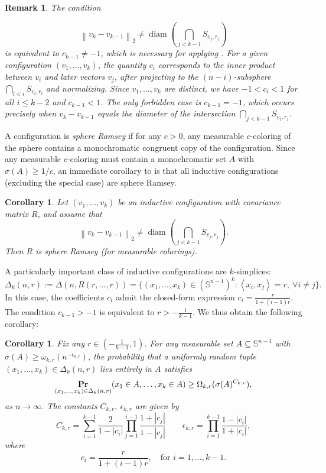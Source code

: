 \documentclass[11pt]{article}
\newtheorem{corollary}[theorem]{Corollary}
\newtheorem{remark}[theorem]{Remark}
\newcommand{\inner}[1]{\left\langle{#1}\right\rangle}
\newcommand{\norm}[1]{\left\lVert#1\right\rVert}
\renewcommand{\Pr}{\mathop{\bf Pr\/}}
\newcommand{\sn}{{\mathbb{S}^{n-1} }}
\begin{document}
\begin{remark}
\label{rem: diameter condition}
The condition 

\[
\norm{v_k - v_{k-1}}_2 \neq \operatorname{diam}\left(\bigcap_{j < k-1} S_{v_j, r_j}\right)
\]
is equivalent to \( c_{k-1} \neq -1 \), which is necessary for applying . For a given configuration \( (v_1, \dots, v_k) \), the quantity \( c_i \) corresponds to the inner product between \( v_i \) and later vectors \( v_j \), after projecting to the $(n-i)$-subsphere \( \bigcap_{l < i} S_{v_l, r_l} \) and normalizing. Since \( v_1, \dots, v_k \) are distinct, we have \( -1 < c_i < 1 \) for all \( i \leq k - 2 \) and \( c_{k-1} < 1 \). The only forbidden case is \( c_{k-1} = -1 \), which occurs precisely when \( v_k - v_{k-1} \) equals the diameter of the intersection $\bigcap_{j < k-1} S_{v_j, r_j}$.
\end{remark}

A configuration is \textit{sphere Ramsey} if for any $c>0$, any measurable $c$-coloring of the sphere contains a monochromatic congruent copy of the configuration. Since any measurable $c$-coloring must contain a monochromatic set $A$ with $\sigma(A)\geq 1/c$, an immediate corollary to  is that all inductive configurations (excluding the special case) are sphere Ramsey.
\begin{corollary}
    Let \( (v_1, \dots, v_k) \) be an inductive configuration with covariance matrix \( R \), and assume that
\[
\norm{v_k - v_{k-1}}_2 \neq \operatorname{diam}\left(\bigcap_{j < k-1} S_{v_j, r_j}\right).
\]
Then $R$ is sphere Ramsey (for measurable colorings).
\end{corollary}

A particularly important class of inductive configurations are \( k \)-simplices:
\[
\Delta_k(n, r) := \Delta(n, R(r, \dots, r)) = \{(x_1, \dots, x_k) \in (\sn)^k : \inner{x_i, x_j} = r,\ \forall i \neq j \}.
\]
In this case, the coefficients \( c_i \) admit the closed-form expression \( c_i = \frac{r}{1 + (i - 1)r} \). The condition \( c_{k-1} > -1 \) is equivalent to \( r > -\frac{1}{k - 1} \). We thus obtain the following corollary:

\begin{corollary}
\label{col: k simplex density}
Fix any \( r \in \left(-\frac{1}{k - 1}, 1\right) \). For any measurable set \( A \subseteq \mathbb{S}^{n-1} \) with \( \sigma(A) \geq \omega_{k,r}(n^{-\epsilon_{k,r}}) \), the probability that a uniformly random tuple \( (x_1, \dots, x_k) \in \Delta_k(n, r) \) lies entirely in \( A \) satisfies
\[
\Pr_{(x_1, \dots, x_k) \in \Delta_k(n, r)}(x_1 \in A, \dots, x_k \in A) \geq \Omega_{k,r}(\sigma(A)^{C_{k,r}}),
\]
as \( n \to \infty \). The constants \( C_{k,r},\ \epsilon_{k,r} \) are given by
\[
C_{k,r} = \sum_{i = 1}^{k - 1} \frac{2}{1 - |c_i|} \prod_{j = 1}^{i - 1} \frac{1 + |c_j|}{1 - |c_j|}
\qquad
\epsilon_{k,r}=\prod_{i=1}^{k-1}\frac{1-|c_i|}{1+|c_i|},
\]
where
\[
c_i = \frac{r}{1 + (i - 1)r}, \quad \text{for } i = 1, \dots, k - 1.
\]
\end{corollary}
\end{document}
